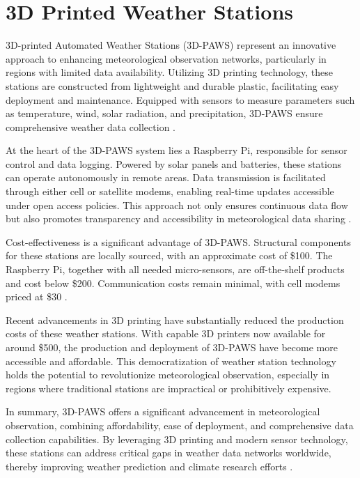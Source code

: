 \section{3D Printed Weather Stations}
\label{sec: 3d_printed_stations}

3D-printed Automated Weather Stations (3D-PAWS) represent an innovative approach to enhancing meteorological observation networks, particularly in regions with limited data availability.
Utilizing 3D printing technology, these stations are constructed from lightweight and durable plastic, facilitating easy deployment and maintenance.
Equipped with sensors to measure parameters such as temperature, wind, solar radiation, and precipitation, 3D-PAWS ensure comprehensive weather data collection \cite{mwangi2017paws}.

At the heart of the 3D-PAWS system lies a Raspberry Pi, responsible for sensor control and data logging. Powered by solar panels and batteries, these stations can operate autonomously in remote areas.
Data transmission is facilitated through either cell or satellite modems, enabling real-time updates accessible under open access policies.
This approach not only ensures continuous data flow but also promotes transparency and accessibility in meteorological data sharing \cite{mwangi2017paws}.

Cost-effectiveness is a significant advantage of 3D-PAWS. Structural components for these stations are locally sourced, with an approximate cost of \$100.
The Raspberry Pi, together with all needed micro-sensors, are off-the-shelf products and cost below \$200. Communication costs remain minimal, with cell modems priced at \$30 \cite{mwangi2017paws}.

Recent advancements in 3D printing have substantially reduced the production costs of these weather stations.
With capable 3D printers now available for around \$500, the production and deployment of 3D-PAWS have become more accessible and affordable.
This democratization of weather station technology holds the potential to revolutionize meteorological observation, especially in regions where traditional stations are impractical or prohibitively expensive.

In summary, 3D-PAWS offers a significant advancement in meteorological observation, combining affordability, ease of deployment, and comprehensive data collection capabilities.
By leveraging 3D printing and modern sensor technology, these stations can address critical gaps in weather data networks worldwide, thereby improving weather prediction and climate research efforts \cite{muita2021}.

